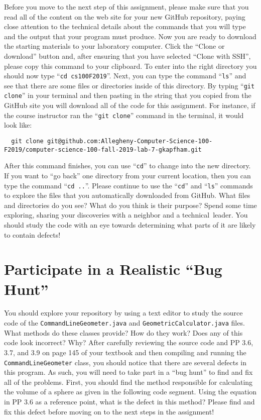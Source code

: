\documentclass[11pt]{article}
\newcommand{\command}[1]{``\lstinline{#1}''}
\newcommand{\step}[1]{``{#1}''}
\begin{document}
Before you move to the next step of this assignment, please make sure that you
read all of the content on the web site for your new GitHub repository, paying
close attention to the technical details about the commands that you will type
and the output that your program must produce. Now you are ready to download the
starting materials to your laboratory computer. Click the ``Clone or download''
button and, after ensuring that you have selected ``Clone with SSH'', please
copy this command to your clipboard. To enter into the right directory you
should now type \command{cd cs100F2019}. Next, you can type the command
\command{ls} and see that there are some files or directories inside of this
directory. By typing \command{git clone} in your terminal and then pasting in
the string that you copied from the GitHub site you will download all of the
code for this assignment. For instance, if the course instructor ran the
\command{git clone} command in the terminal, it would look like:

\begin{lstlisting}
  git clone git@github.com:Allegheny-Computer-Science-100-F2019/computer-science-100-fall-2019-lab-7-gkapfham.git
\end{lstlisting}

After this command finishes, you can use \command{cd} to change into the new
directory. If you want to \step{go back} one directory from your current
location, then you can type the command \command{cd ..}. Please continue to use
the \command{cd} and \command{ls} commands to explore the files that you
automatically downloaded from GitHub. What files and directories do you see?
What do you think is their purpose? Spend some time exploring, sharing your
discoveries with a neighbor and a \mbox{technical leader}. You should study the
code with an eye towards determining what parts of it are likely to contain
defects!

\section*{Participate in a Realistic ``Bug Hunt''}

You should explore your repository by using a text editor to study the source
code of the {\tt CommandLineGeometer.java} and {\tt GeometricCalculator.java}
files. What methods do these classes provide? How do they work? Does any of this
code look incorrect? Why? After carefully reviewing the source code and PP 3.6,
3.7, and 3.9 on page 145 of your textbook and then compiling and running the
{\tt CommandLineGeometer} class, you should notice that there are several
defects in this program. As such, you will need to take part in a ``bug hunt''
to find and fix all of the problems. First, you should find the method
responsible for calculating the volume of a sphere as given in the following
code segment. Using the equation in PP 3.6 as a reference point, what is the
defect in this method? Please find and fix this defect before moving on to the
next steps in the assignment!
\end{document}
